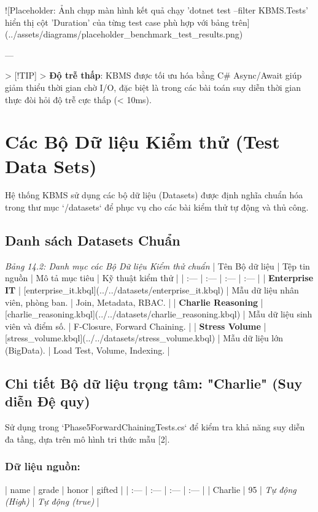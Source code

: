 ![Placeholder: Ảnh chụp màn hình kết quả chạy 'dotnet test --filter KBMS.Tests' hiển thị cột 'Duration' của từng test case phù hợp với bảng trên](../assets/diagrams/placeholder\_benchmark\_test\_results.png)

---

> [!TIP]
> \textbf{Độ trễ thấp}: KBMS được tối ưu hóa bằng C\# Async/Await giúp giảm thiểu thời gian chờ I/O, đặc biệt là trong các bài toán suy diễn thời gian thực đòi hỏi độ trễ cực thấp (< 10ms).

\section{Các Bộ Dữ liệu Kiểm thử (Test Data Sets)}

Hệ thống KBMS sử dụng các bộ dữ liệu (Datasets) được định nghĩa chuẩn hóa trong thư mục `/datasets` để phục vụ cho các bài kiểm thử tự động và thủ công.

\subsection{Danh sách Datasets Chuẩn}

\textit{Bảng 14.2: Danh mục các Bộ Dữ liệu Kiểm thử chuẩn}
| Tên Bộ dữ liệu | Tệp tin nguồn | Mô tả mục tiêu | Kỹ thuật kiểm thử |
| :--- | :--- | :--- | :--- |
| \textbf{Enterprise IT} | [enterprise\_it.kbql](../../datasets/enterprise\_it.kbql) | Mẫu dữ liệu nhân viên, phòng ban. | Join, Metadata, RBAC. |
| \textbf{Charlie Reasoning} | [charlie\_reasoning.kbql](../../datasets/charlie\_reasoning.kbql) | Mẫu dữ liệu sinh viên và điểm số. | F-Closure, Forward Chaining. |
| \textbf{Stress Volume} | [stress\_volume.kbql](../../datasets/stress\_volume.kbql) | Mẫu dữ liệu lớn (BigData). | Load Test, Volume, Indexing. |

\subsection{Chi tiết Bộ dữ liệu trọng tâm: "Charlie" (Suy diễn Đệ quy)}

Sử dụng trong `Phase5ForwardChainingTests.cs` để kiểm tra khả năng suy diễn đa tầng, dựa trên mô hình tri thức mẫu [2].

\subsubsection{Dữ liệu nguồn:}
| name | grade | honor | gifted |
| :--- | :--- | :--- | :--- |
| Charlie | 95 | \textit{Tự động (High)} | \textit{Tự động (true)} |

